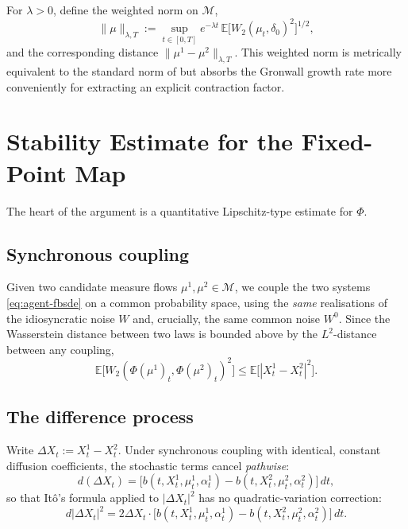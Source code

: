 \documentclass[11pt]{article}
\theoremstyle{remark}
\begin{document}
For $\lambda > 0$, define the weighted norm on $\mathcal{M}$,
\[
    \|\mu\|_{\lambda,T} := \sup_{t\in[0,T]} e^{-\lambda t}\,
    \mathbb{E}\big[W_2(\mu_t, \delta_0)^2\big]^{1/2},
\]
and the corresponding distance $\|\mu^1-\mu^2\|_{\lambda,T}$. This weighted norm
is metrically equivalent to the standard norm of \citet{carmonadelarue2018} but
absorbs the Gronwall growth rate more conveniently for extracting an explicit
contraction factor.

\section{Stability Estimate for the Fixed-Point Map}
\label{sec:stability}

The heart of the argument is a quantitative Lipschitz-type estimate for $\Phi$.

\subsection{Synchronous coupling}

Given two candidate measure flows $\mu^1, \mu^2 \in \mathcal{M}$, we couple the two
systems \eqref{eq:agent-fbsde} on a common probability space, using the \emph{same}
realisations of the idiosyncratic noise $W$ and, crucially, the same common noise
$W^0$. Since the Wasserstein distance between two laws is bounded above by the
$L^2$-distance between any coupling,
\begin{equation}
    \mathbb{E}\big[W_2(\Phi(\mu^1)_t, \Phi(\mu^2)_t)^2\big] \le
    \mathbb{E}\big[|X_t^1 - X_t^2|^2\big].
    \label{eq:wasserstein-l2-bound}
\end{equation}

\subsection{The difference process}

Write $\Delta X_t := X_t^1 - X_t^2$. Under synchronous coupling with identical,
constant diffusion coefficients, the stochastic terms cancel \emph{pathwise}:
\[
    d(\Delta X_t) = \big[b(t,X_t^1,\mu_t^1,\alpha_t^1) - b(t,X_t^2,\mu_t^2,\alpha_t^2)
    \big]\, dt,
\]
so that It\^o's formula applied to $|\Delta X_t|^2$ has no quadratic-variation
correction:
\begin{equation}
    d|\Delta X_t|^2 = 2\Delta X_t \cdot \big[b(t,X_t^1,\mu_t^1,\alpha_t^1) -
    b(t,X_t^2,\mu_t^2,\alpha_t^2)\big]\, dt.
    \label{eq:ito-expansion}
\end{equation}
\end{document}
